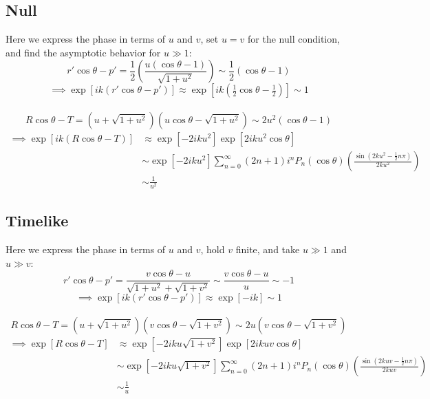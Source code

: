 \documentclass[10pt,letterpaper]{article}
\begin{document}
\subsection*{Null}
Here we express the phase in terms of $u$ and $v$, set $u=v$ for the null condition, and find the asymptotic behavior for $u\gg 1$:
\begin{equation}
r'\cos\theta-p' = \frac{1}{2}\left( \frac{u(\cos\theta-1)}{\sqrt{1+u^2}}\right) \sim \frac{1}{2}(\cos\theta-1)
\end{equation}
\begin{equation}
\implies \exp[{ik(r'\cos\theta-p')} ]\approx\exp[ik(\tfrac12\cos\theta -\tfrac12)] \sim 1
\end{equation}
\\ 
\begin{equation}
R\cos\theta-T = (u+\sqrt{1+u^2})(u\cos\theta-\sqrt{1+u^2})\sim 2u^2(\cos\theta-1)
\end{equation}
\begin{align}
\implies \exp[{ik(R\cos\theta-T)} ]&\approx \exp[-2ik u^2]\exp[2ik u^2\cos\theta]\\
&\sim \exp[-2ik u^2] 
 \sum_{n=0}^{\infty}(2n+1)i^nP_n(\cos\theta)\left( \frac{\sin(2ku^2-\frac12 n\pi)}{2ku^2}\right)\\
&\sim \frac{1}{u^2}
\end{align}
\subsection*{Timelike}
Here we express the phase in terms of $u$ and $v$, hold $v$ finite, and take $u\gg 1$ and $u\gg v$:
\begin{equation}
r'\cos\theta-p' = \frac{v\cos\theta -u}{\sqrt{1+u^2}+\sqrt{1+v^2}}\sim \frac{v\cos\theta-u}{u}\sim -1
\end{equation}
\begin{equation}
\implies \exp[ik(r'\cos\theta -p')] \approx \exp[-ik] \sim 1
\end{equation}
\\
\begin{equation}
R\cos\theta - T = (u+\sqrt{1+u^2})(v\cos\theta - \sqrt{1+v^2}) \sim 2u(v\cos\theta-\sqrt{1+v^2})
\end{equation}
\begin{align}
\implies \exp[R\cos\theta-T]&\approx \exp[ -2iku\sqrt{1+v^2}]\exp[2ik uv\cos\theta]\\
&\sim  \exp[-2ik u\sqrt{1+v^2}] 
 \sum_{n=0}^{\infty}(2n+1)i^nP_n(\cos\theta)\left( \frac{\sin(2kuv-\frac12 n\pi)}{2kuv}\right)\\
&\sim \frac{1}{u}
\end{align}
\end{document}
